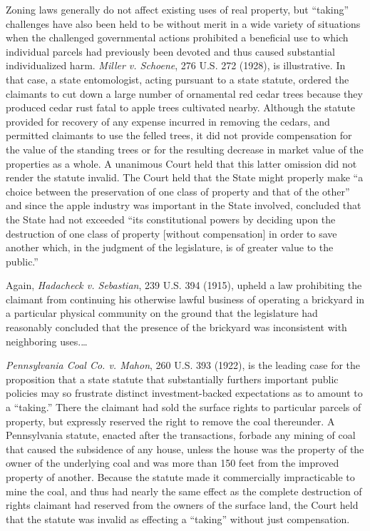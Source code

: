 Zoning laws generally do not affect existing uses of real property, but
``taking'' challenges have also been held to be without merit in a wide variety
of situations when the challenged governmental actions prohibited a beneficial
use to which individual parcels had previously been devoted and thus caused
substantial individualized harm. \textit{Miller v. Schoene}, 276 U.S. 272
(1928), is illustrative. In that case, a state entomologist, acting pursuant to
a state statute, ordered the claimants to cut down a large number of ornamental
red cedar trees because they produced cedar rust fatal to apple trees cultivated
nearby. Although the statute provided for recovery of any expense incurred in
removing the cedars, and permitted claimants to use the felled trees, it did not
provide compensation for the value of the standing trees or for the resulting
decrease in market value of the properties as a whole. A unanimous Court held
that this latter omission did not render the statute invalid. The Court held
that the State might properly make ``a choice between the preservation of one
class of property and that of the other'' and since the apple industry was
important in the State involved, concluded that the State had not exceeded ``its
constitutional powers by deciding upon the destruction of one class of property
[without compensation] in order to save another which, in the judgment of the
legislature, is of greater value to the public.'' 

Again, \textit{Hadacheck v. Sebastian}, 239 U.S. 394 (1915), upheld a law
prohibiting the claimant from continuing his otherwise lawful business of
operating a brickyard in a particular physical community on the ground that the
legislature had reasonably concluded that the presence of the brickyard was
inconsistent with neighboring uses.\ldots

\textit{Pennsylvania Coal Co. v. Mahon}, 260 U.S. 393 (1922), is the leading
case for the proposition that a state statute that substantially furthers
important public policies may so frustrate distinct investment-backed
expectations as to amount to a ``taking.'' There the claimant had sold the
surface rights to particular parcels of property, but expressly reserved the
right to remove the coal thereunder. A Pennsylvania statute, enacted after the
transactions, forbade any mining of coal that caused the subsidence of any
house, unless the house was the property of the owner of the underlying coal and
was more than 150 feet from the improved property of another. Because the
statute made it commercially impracticable to mine the coal, and thus had nearly
the same effect as the complete destruction of rights claimant had reserved from
the owners of the surface land, the Court held that the statute was invalid as
effecting a ``taking'' without just compensation. 

